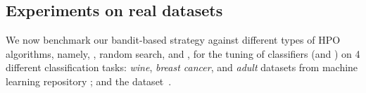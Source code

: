 
\subsection{Experiments on real datasets}\label{sec:dttts.experiments.real}
We now benchmark our bandit-based strategy against different types of HPO algorithms, namely, \TPE, random search, \Hyperband and \HTTTS{}, for the tuning of classifiers (\SVM and \MLP) on 4 different classification tasks: \textit{wine}, \textit{breast cancer}, and \textit{adult} datasets from \UCI machine learning repository \citep{dua2017}; and the \MNIST dataset~\citep{lecun1998gradient}.

